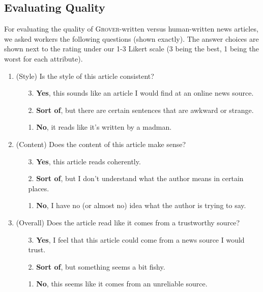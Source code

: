 \documentclass{article}
\newcommand{\modelname}{{\textsc{Grover}}}
\begin{document}
\subsection{Evaluating Quality}
For evaluating the quality of \modelname-written versus human-written news articles, we asked workers the following questions (shown exactly). The answer choices are shown next to the rating under our 1-3 Likert scale (3 being the best, 1 being the worst for each attribute).
\begin{enumerate}[label=(\alph*)]
    \item (Style) Is the style of this article consistent?
    \begin{enumerate}
        \item[3.] \textbf{Yes}, this sounds like an article I would find at an online news source.
        \item[2.] \textbf{Sort of}, but there are certain sentences that are awkward or strange.
        \item[1.] \textbf{No}, it reads like it's written by a madman.
    \end{enumerate}
    \item (Content) Does the content of this article make sense?
        \begin{enumerate}
        \item[3.]  \textbf{Yes}, this article reads coherently.
        \item[2.]  \textbf{Sort of}, but I don't understand what the author means in certain places.
        \item[1.]  \textbf{No}, I have no (or almost no) idea what the author is trying to say.
    \end{enumerate}
    \item (Overall) Does the article read like it comes from a trustworthy source?
    \begin{enumerate}
        \item[3.]  \textbf{Yes}, I feel that this article could come from a news source I would trust.
        \item[2.]  \textbf{Sort of}, but something seems a bit fishy.
        \item[1.]  \textbf{No}, this seems like it comes from an unreliable source.
    \end{enumerate}
\end{enumerate}
\end{document}
